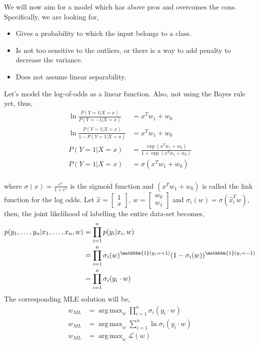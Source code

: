 \documentclass{article}
\DeclareMathOperator*{\argmax}{arg\,max}
\newcommand{\newpara}{\leavevmode\newline}
\newcommand{\xhat}{\hat{x}}
\begin{document}
We will now aim for a model which has above pros and overcomes the cons. Specifically, we are looking for,
\begin{itemize}
    \item Gives a probability to which the input belongs to a class.
    \item Is not too sensitive to the outliers, or there is a way to add penalty to decrease the variance.
    \item Does not assume linear separability.
\end{itemize}

Let's model the log-of-odds as a linear function. Also, not using the Bayes rule yet, thus,
\begin{align*}
    \ln{\frac{P(Y=1|X=x)}{P(Y=-1|X=x)}} &= x^Tw_1+w_0\\
    \ln{\frac{P(Y=1|X=x)}{1-P(Y=1|X=x)}} &= x^Tw_1+w_0\\
    P(Y=1|X=x) &= \frac{\exp{(x^Tw_1+w_0)}}{1+\exp{(x^Tw_1+w_0)}}\\
    P(Y=1|X=x) &= \sigma(x^Tw_1+w_0)\\
\end{align*}

where $\sigma(x) = \frac{e^x}{1+e^x}$ is the sigmoid function and $(x^Tw_1+w_0)$ is called the link function for the log odds.
\newpara
Let $\xhat = \begin{bmatrix}1\\x\end{bmatrix}$, $w = \begin{bmatrix}w_0\\w_1\end{bmatrix}$ and $\sigma_i(w) = \sigma(\xhat_i^Tw)$, then, the joint likelihood of labelling the entire data-set becomes,
\begin{align*}
    p(y_1,\dots,y_n | x_1, \dots, x_n, w) &= \prod_{i=1}^n p(y_i|x_i,w)\\
    &= \prod_{i=1}^n \sigma_i(w)^{\mathbbm{1}(y_i = +1)} (1-\sigma_i(w))^{\mathbbm{1}(y_i = -1)} \\
    &= \prod_{i=1}^n \sigma_i(y_i\cdot w) \\
\end{align*}
The corresponding MLE solution will be,
\begin{align*}
    w_{ML} & = \argmax_w \prod_{i=1}^n \sigma_i(y_i\cdot w) \\
    w_{ML} & = \argmax_w \sum_{i=1}^n{\ln{\sigma_i(y_i\cdot w)} }\\
    w_{ML} & = \argmax_w \mathcal{L}(w) 
\end{align*}
\end{document}
